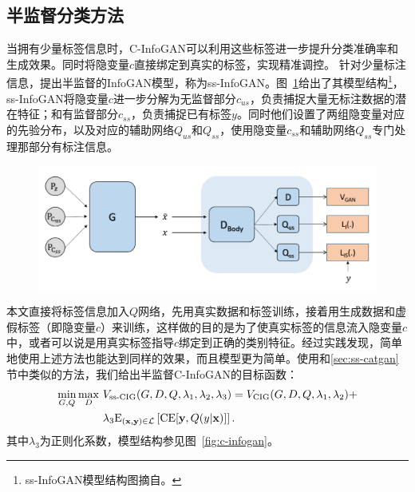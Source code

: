 \subsection{半监督分类方法}
当拥有少量标签信息时，C-InfoGAN可以利用这些标签进一步提升分类准确率和生成效果。同时将隐变量$c$直接绑定到真实的标签，实现精准调控。
针对少量标注信息，\citet{spurr2017guiding}提出半监督的InfoGAN模型，称为ss-InfoGAN。图~\ref{fig:arch-ssinfogan}给出了其模型结构\footnote{ss-InfoGAN模型结构图摘自\citet{spurr2017guiding}。}，ss-InfoGAN将隐变量$c$进一步分解为无监督部分$c_{us}$，负责捕捉大量无标注数据的潜在特征；和有监督部分$c_{ss}$，负责捕捉已有标签$y$。同时他们设置了两组隐变量对应的先验分布，以及对应的辅助网络$Q_{us}$和$Q_{ss}$，使用隐变量$c_{ss}$和辅助网络$Q_{ss}$专门处理那部分有标注信息。
\begin{figure}[htbp]
  \centering
  \includegraphics[width=\onef\textwidth]{Img/arch-ssinfogan.png}
  \label{fig:arch-ssinfogan}
\end{figure}
本文直接将标签信息加入$Q$网络，先用真实数据和标签训练，接着用生成数据和虚假标签（即隐变量$c$）来训练，这样做的目的是为了使真实标签的信息流入隐变量$c$中，或者可以说是用真实标签指导$c$绑定到正确的类别特征。经过实践发现，简单地使用上述方法也能达到同样的效果，而且模型更为简单。使用和\ref{sec:ss-catgan}节中类似的方法，我们给出半监督C-InfoGAN的目标函数：
\begin{equation}
  \begin{split}
  \min_{G,Q}\max_D~ &V_{\text{ss-CIG}}(G,D,Q,\lambda_1,\lambda_2,\lambda_3) = 
  V_{\text{CIG}}(G,D,Q,\lambda_1,\lambda_2) + \\
  &\lambda_3 \text{E}_{(\mathbf{x}, \mathbf{y}) \in \mathcal{L}}
  \left[ \text{CE}[\mathbf{y}, Q(y|\mathbf{x})] \right].
  \end{split}
\end{equation}
其中$\lambda_3$为正则化系数，模型结构参见图~\ref{fig:c-infogan}。

